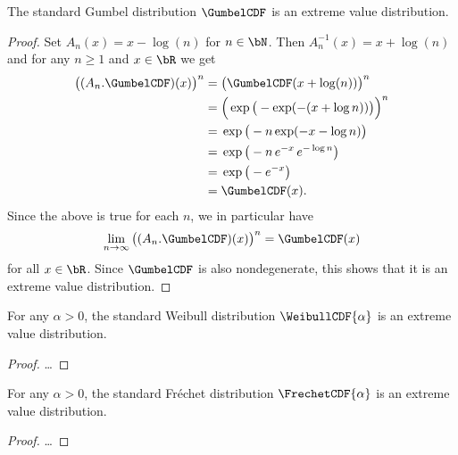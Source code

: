 \begin{theorem}
  \label{thm:Gumbel-is-extr-val-distr}
  \leanok
  The standard Gumbel distribution $\GumbelCDF$ is an extreme value
  distribution.
\end{theorem}
\begin{proof}
  Set $A_n(x) = x - \log(n)$ for $n \in \bN$. Then
  $A_n^{-1}(x) = x + \log(n)$ and for any $n \ge 1$ and $x \in \bR$ we get
  \begin{align*}
    \big( (A_n . \GumbelCDF)(x) \big)^n
    = \; & \big( \GumbelCDF(x + \log(n)) \big)^n \\
    = \; & \Big( \exp \big( - \exp(-(x + \log n)) \big) \Big)^n \\
    = \; & \exp \big( - n \exp(-x - \log n) \big) \\
    = \; & \exp \big( - n \, e^{-x} \, e^{-\log n}  \big) \\
    = \; & \exp \big( - e^{-x} \big) \\
    = \; & \GumbelCDF(x) .
  \end{align*}
  Since the above is true for each $n$, we in particular have
  \begin{align*}
    \lim_{n \to \infty} \big( (A_n . \GumbelCDF)(x) \big)^n
    = \GumbelCDF(x)
  \end{align*}
  for all $x \in \bR$. Since $\GumbelCDF$ is also nondegenerate,
  this shows that it is an extreme value distribution.
\end{proof}

\begin{theorem}
  \label{thm:Weibull-is-extr-val-distr}
  For any $\alpha > 0$, the standard Weibull distribution $\WeibullCDF{\alpha}$
  is an extreme value distribution.
\end{theorem}
\begin{proof}
  \ldots
\end{proof}

\begin{theorem}
  \label{thm:Frechet-is-extr-val-distr}
  For any $\alpha > 0$, the standard Fr\'echet distribution $\FrechetCDF{\alpha}$
  is an extreme value distribution.
\end{theorem}
\begin{proof}
  \uses{}
  \ldots
\end{proof}



